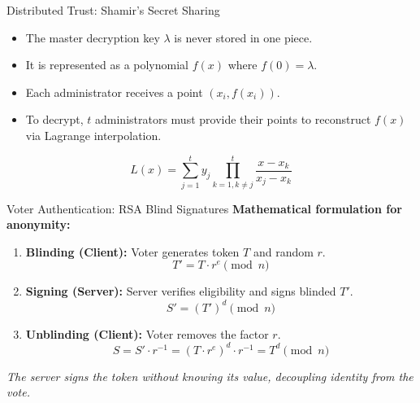 \documentclass{beamer}
\begin{document}
\begin{frame}{Distributed Trust: Shamir's Secret Sharing}
    \begin{itemize}
        \item The master decryption key $\lambda$ is never stored in one piece.
        \item It is represented as a polynomial $f(x)$ where $f(0) = \lambda$.
        \item Each administrator receives a point $(x_i, f(x_i))$.
        \item To decrypt, $t$ administrators must provide their points to reconstruct $f(x)$ via Lagrange interpolation.
    \end{itemize}
    \vspace{0.5cm}
    \begin{equation*}
        L(x) = \sum_{j=1}^{t} y_j \prod_{k=1, k \neq j}^{t} \frac{x - x_k}{x_j - x_k}
    \end{equation*}
\end{frame}

\begin{frame}{Voter Authentication: RSA Blind Signatures}
    \textbf{Mathematical formulation for anonymity:}
    \begin{enumerate}
        \item \textbf{Blinding (Client):} Voter generates token $T$ and random $r$.
        \begin{equation*} T' = T \cdot r^e \pmod n \end{equation*}
        \item \textbf{Signing (Server):} Server verifies eligibility and signs blinded $T'$.
        \begin{equation*} S' = (T')^d \pmod n \end{equation*}
        \item \textbf{Unblinding (Client):} Voter removes the factor $r$.
        \begin{equation*} S = S' \cdot r^{-1} = (T \cdot r^e)^d \cdot r^{-1} = T^d \pmod n \end{equation*}
    \end{enumerate}
    \centering \textit{The server signs the token without knowing its value, decoupling identity from the vote.}
\end{frame}
\end{document}
